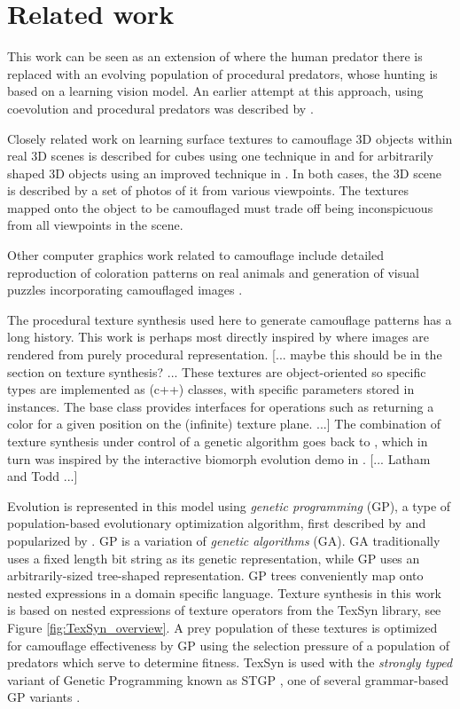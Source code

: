\documentclass[sigconf]{acmart}
\newcommand{\jargon}[1]{\textit{#1}}
\begin{document}
\section{Related work}
This work can be seen as an extension of \citet{Reynolds2011} where the human predator there is replaced with an evolving population of procedural predators, whose hunting is based on a learning vision model. An earlier attempt at this approach, using coevolution and procedural predators was described by \citet{harrington_coevolution_2014}.
\par
Closely related work on learning surface textures to camouflage 3D objects within real 3D scenes is described for cubes using one technique in \citet{owens_camouflaging_2014} and for arbitrarily shaped 3D objects using an improved technique in \citet{guo_ganmouflage_2022}. In both cases, the 3D scene is described by a set of photos of it from various viewpoints. The textures mapped onto the object to be camouflaged must trade off being inconspicuous from all viewpoints in the scene.
\par
Other computer graphics work related to camouflage include detailed reproduction of coloration patterns on real animals \cite{de_gomensoro_malheiros_leopard_2020} and generation of visual puzzles incorporating camouflaged images \cite{chu_camo_image_2010} \cite{Zhang_Yin_Nie_Zheng_2020}.
\par
The procedural texture synthesis used here to generate camouflage patterns has a long history. This work is perhaps most directly inspired by \citet{perlin_image_1985} where images are rendered from purely procedural representation. [... maybe this should be in the section on texture synthesis? ... These textures are object-oriented so specific types are implemented as (c++) classes, with specific parameters stored in instances. The base class provides interfaces for operations such as returning a color for a given position on the (infinite) texture plane. ...] The combination of texture synthesis under control of a genetic algorithm goes back to \citet{sims_artificial_1991}, which in turn was inspired by the interactive biomorph evolution demo in \citet{dawkins_blind_1986}. [... Latham and Todd ...]
\par
Evolution is represented in this model using \jargon{genetic programming} (GP), a type of population-based evolutionary optimization algorithm, first described by \citet{cramer_representation_1985} and popularized by \citet{koza_genetic_1992}. GP is a variation of \jargon{genetic algorithms} (GA). GA traditionally uses a fixed length bit string as its genetic representation, while GP uses an arbitrarily-sized tree-shaped representation. GP trees conveniently map onto nested expressions in a domain specific language. Texture synthesis in this work is based on nested expressions of texture operators from the TexSyn library, see Figure \ref{fig:TexSyn_overview}. A prey population of these textures is optimized for camouflage effectiveness by GP using the selection pressure of a population of predators which serve to determine fitness. TexSyn is used with the \jargon{strongly typed} variant of Genetic Programming known as STGP \cite{montana_strongly_1995}, one of several grammar-based GP variants \cite{Mckay_2010}.
\end{document}
